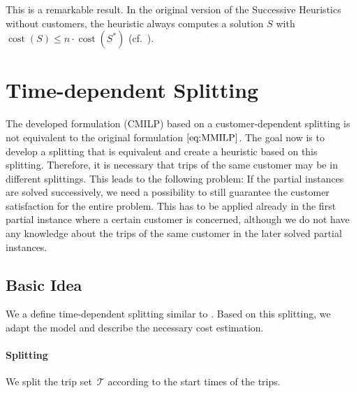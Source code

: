 This is a remarkable result. In the original version of the Successive Heuristics without customers, the heuristic always computes a solution $S$ with ${\operatorname{cost}\left(S\right)\leq n\cdot\operatorname{cost}\left(S^*\right)}$ (cf.~\cite[p.~130]{Knoll}).


\section{Time-dependent Splitting}
\label{sec:time_dependent_splitting}

The developed formulation (CMILP) based on a customer-dependent splitting is not equivalent to the original formulation $\eqref{eq:MMILP}$. The goal now is to develop a splitting that is equivalent and create a heuristic based on this splitting. Therefore, it is necessary that trips of the same customer may be in different splittings. This leads to the following problem: If the partial instances are solved successively, we need a possibility to still guarantee the customer satisfaction for the entire problem. This has to be applied already in the first partial instance where a certain customer is concerned, although we do not have any knowledge about the trips of the same customer in the later solved partial instances.

\subsection{Basic Idea}
\label{sec:basic_idea}

We a define time-dependent splitting similar to \cite{Knoll}. Based on this splitting, we adapt the model and describe the necessary cost estimation.

\paragraph{Splitting} \parfill

We split the trip set~$\mathcal{T}$ according to the start times of the trips.

